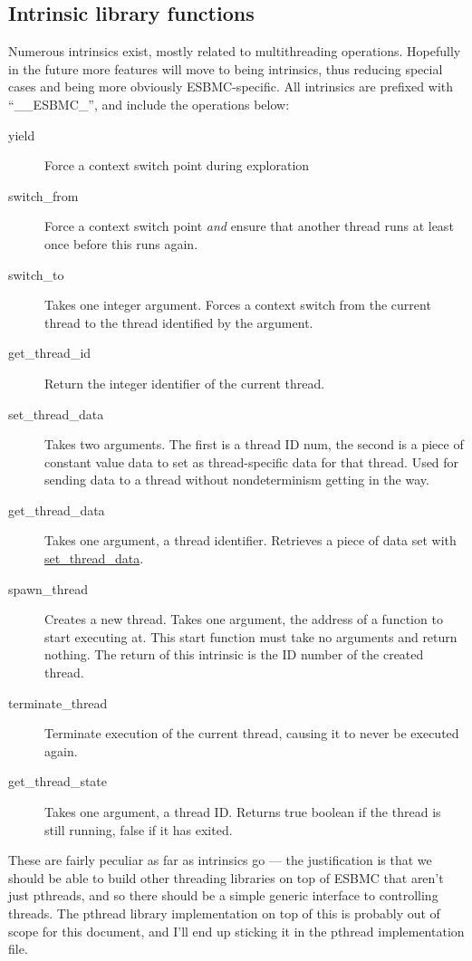 \documentclass{article}
\begin{document}
\subsection{Intrinsic library functions}

Numerous intrinsics exist, mostly related to multithreading operations.
Hopefully in the future more features will move to being intrinsics, thus
reducing special cases and being more obviously ESBMC-specific. All intrinsics
are prefixed with ``\_\_ESBMC\_'', and include the operations below:

\begin{description}
\item[yield] Force a context switch point during exploration
\item[switch\_from] Force a context switch point \textit{and} ensure that
another thread runs at least once before this runs again.
\item[switch\_to] Takes one integer argument. Forces a context switch from the
current thread to the thread identified by the argument.
\item[get\_thread\_id] Return the integer identifier of the current thread.
\item[set\_thread\_data] Takes two arguments. The first is a thread ID num,
the second  is a piece of constant value data to set as thread-specific
data for that thread. Used for sending data to a thread without nondeterminism
getting in the way.
\item[get\_thread\_data] Takes one argument, a thread identifier. Retrieves
a piece of data set with \url{set_thread_data}.
\item[spawn\_thread] Creates a new thread. Takes one argument, the address
of a function to start executing at. This start function must take no arguments
and return nothing. The return of this intrinsic is the ID number of the
created thread.
\item[terminate\_thread] Terminate execution of the current thread, causing it
to never be executed again.
\item[get\_thread\_state] Takes one argument, a thread ID. Returns true boolean
if the thread is still running, false if it has exited.
\end{description}

These are fairly peculiar as far as intrinsics go --- the justification is that
we should be able to build other threading libraries on top of ESBMC that aren't
just pthreads, and so there should be a simple generic interface to controlling
threads. The pthread library implementation on top of this is probably out of
scope for this document, and I'll end up sticking it in the pthread
implementation file.
\end{document}
